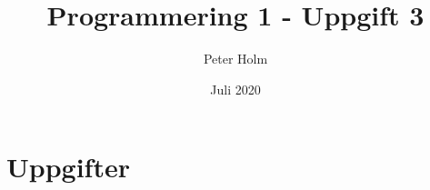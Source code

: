 \documentclass{article}
\title{Programmering 1 - Uppgift 3}
\author{Peter Holm}
\date{Juli 2020}
\begin{document}
\maketitle
\section{Uppgifter}


\newpage



\newpage



\newpage



\newpage


\newpage

\end{document}
